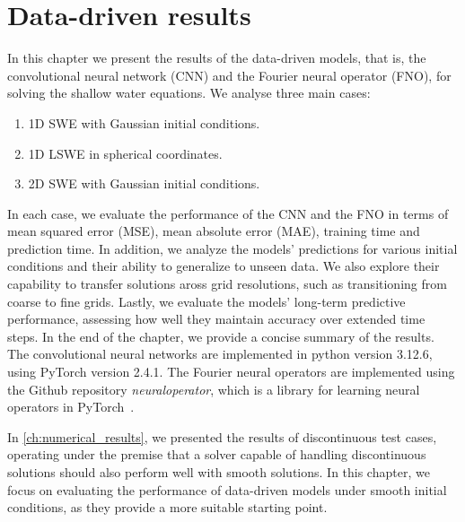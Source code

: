 \chapter{Data-driven results}\label{ch:data-driven-results}
In this chapter we present the results of the data-driven models, that is, the convolutional neural network (CNN) and the Fourier neural operator (FNO), for solving the shallow water equations.
We analyse three main cases:
\begin{enumerate}
    \item 1D SWE with Gaussian initial conditions. 
    \item 1D LSWE in spherical coordinates.
    \item 2D SWE with Gaussian initial conditions.
\end{enumerate}
In each case, we evaluate the performance of the CNN and the FNO in terms of mean squared error (MSE), mean absolute error (MAE), training time and prediction time.
In addition, we analyze the models' predictions for various initial conditions and their ability to generalize to unseen data.
We also explore their capability to transfer solutions aross grid resolutions, such as transitioning from coarse to fine grids.
Lastly, we evaluate the models' long-term predictive performance, assessing how well they maintain accuracy over extended time steps.
In the end of the chapter, we provide a concise summary of the results.
The convolutional neural networks are implemented in python version 3.12.6, using PyTorch version 2.4.1.
The Fourier neural operators are implemented using the Github repository \textit{neuraloperator}, which is a library for learning neural operators in PyTorch~\cite{neuraloperator}.

In \autoref{ch:numerical_results}, we presented the results of discontinuous test cases, operating under the premise that a solver capable of handling discontinuous solutions should also perform well with smooth solutions.
In this chapter, we focus on evaluating the performance of data-driven models under smooth initial conditions, as they provide a more suitable starting point.

